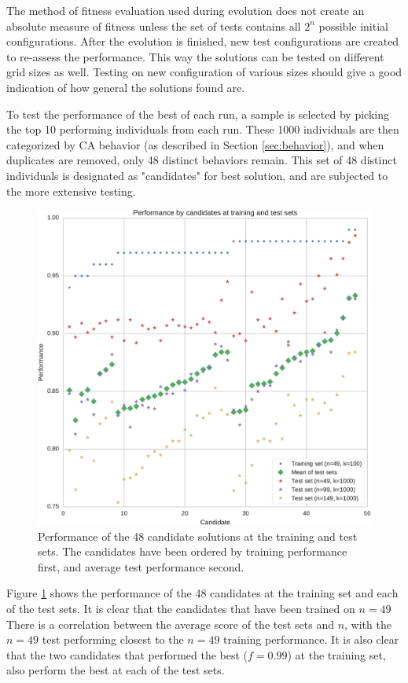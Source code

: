 The method of fitness evaluation used during evolution does not create an absolute measure of fitness unless the set of tests contains all $2^n$ possible initial configurations.
After the evolution is finished, new test configurations are created to re-assess the performance.
This way the solutions can be tested on different grid sizes as well.
Testing on new configuration of various sizes should give a good indication of how general the solutions found are.

To test the performance of the best of each run,
a sample is selected by picking the top 10 performing individuals from each run.
These 1000 individuals are then categorized by CA behavior (as described in Section \ref{sec:behavior}),
and when duplicates are removed, only 48 distinct behaviors remain.
This set of 48 distinct individuals is designated as "candidates" for best solution, and are subjected to the more extensive testing.

\begin{figure}
\centering
\includegraphics[width=\textwidth, keepaspectratio]{fig/sync_scores}
\caption[
    Performance of the 48 candidate solutions at the training and test sets.
]{
    Performance of the 48 candidate solutions at the training and test sets.
    The candidates have been ordered by training performance first, and average test performance second.
    }
\label{fig:sync_scores}
\end{figure}

Figure \ref{fig:sync_scores} shows the performance of the 48 candidates at the training set and each of the test sets.
It is clear that the candidates that have been trained on $n=49$
There is a correlation between the average score of the test sets and $n$, with the $n=49$ test performing closest to the $n=49$ training performance.
It is also clear that the two candidates that performed the best ($f=0.99$) at the training set, also perform the best at each of the test sets.

